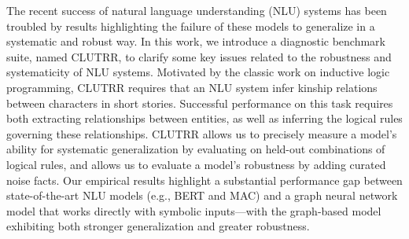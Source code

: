 The recent success of natural language understanding (NLU) systems has been troubled by results highlighting the failure of these models to generalize in a systematic and robust way. In this work, we introduce a diagnostic benchmark suite, named CLUTRR, to clarify some key issues related to the robustness and systematicity of NLU systems. Motivated by the classic work on inductive logic programming, CLUTRR requires that an NLU system infer kinship relations between characters in short stories. Successful performance on this task requires both extracting relationships between entities, as well as inferring the logical rules governing these relationships. CLUTRR allows us to precisely measure a model's ability for systematic generalization by evaluating on held-out combinations of logical rules, and allows us to evaluate a model's robustness by adding curated noise facts. Our empirical results highlight a substantial performance gap between state-of-the-art NLU models (e.g., BERT and MAC) and a graph neural network model that works directly with symbolic inputs---with the graph-based model exhibiting both stronger generalization and greater robustness.